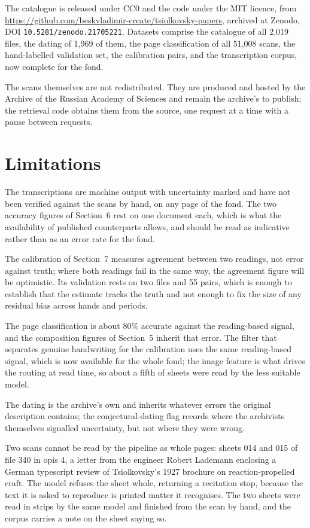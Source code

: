 \documentclass[11pt,a4paper]{article}
\begin{document}
The catalogue is released under CC0 and the code under the MIT licence, from
\url{https://github.com/beskvladimir-create/tsiolkovsky-papers}, archived at
Zenodo, DOI \texttt{10.5281/zenodo.21705221}. Datasets comprise the catalogue of all
2,019 files, the dating of 1,969 of them, the page classification of all
51,008 scans, the hand-labelled validation set, the calibration pairs, and the
transcription corpus, now complete for the fond.

The scans themselves are not redistributed. They are produced and hosted by
the Archive of the Russian Academy of Sciences and remain the archive's to
publish; the retrieval code obtains them from the source, one request at a
time with a pause between requests.

\section{Limitations}\label{limitations}

The transcriptions are machine output with uncertainty marked and have not
been verified against the scans by hand, on any page of the fond. The two
accuracy figures of Section~6 rest on one document each, which is what the
availability of published counterparts allows, and should be read as
indicative rather than as an error rate for the fond.

The calibration of Section~7 measures agreement between two readings, not
error against truth; where both readings fail in the same way, the agreement
figure will be optimistic. Its validation rests on two files and 55 pairs,
which is enough to establish that the estimate tracks the truth and not enough
to fix the size of any residual bias across hands and periods.

The page classification is about 80\% accurate against the reading-based
signal, and the composition figures of Section~5 inherit that error. The
filter that separates genuine handwriting for the calibration uses the same
reading-based signal, which is now available for the whole fond; the image
feature is what drives the routing at read time, so about a fifth of sheets
were read by the less suitable model.

The dating is the archive's own and inherits whatever errors the original
description contains; the conjectural-dating flag records where the archivists
themselves signalled uncertainty, but not where they were wrong.

Two scans cannot be read by the pipeline as whole pages: sheets 014 and 015 of
file 340 in opis 4, a letter from the engineer Robert Lademann enclosing a
German typescript review of Tsiolkovsky's 1927 brochure on reaction-propelled
craft. The model refuses the sheet whole, returning a recitation stop, because
the text it is asked to reproduce is printed matter it recognises. The two
sheets were read in strips by the same model and finished from the scan by
hand, and the corpus carries a note on the sheet saying so.
\end{document}
